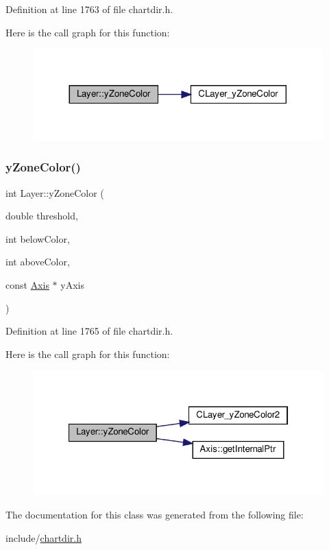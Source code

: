 Definition at line 1763 of file chartdir.\+h.

Here is the call graph for this function\+:
\nopagebreak
\begin{figure}[H]
\begin{center}
\leavevmode
\includegraphics[width=317pt]{class_layer_ae8ce1036fc1aa65453eaf08612e96e33_cgraph}
\end{center}
\end{figure}
\mbox{\label{class_layer_a3a39f0a1174c2ec7c37f477be5c69be8}} 
\subsubsection{\texorpdfstring{y\+Zone\+Color()}{yZoneColor()}\hspace{0.1cm}{\footnotesize\ttfamily [2/2]}}
{\footnotesize\ttfamily int Layer\+::y\+Zone\+Color (\begin{DoxyParamCaption}\item[{double}]{threshold,  }\item[{int}]{below\+Color,  }\item[{int}]{above\+Color,  }\item[{const \hyperlink{class_axis}{Axis} $\ast$}]{y\+Axis }\end{DoxyParamCaption})\hspace{0.3cm}{\ttfamily [inline]}}



Definition at line 1765 of file chartdir.\+h.

Here is the call graph for this function\+:
\nopagebreak
\begin{figure}[H]
\begin{center}
\leavevmode
\includegraphics[width=322pt]{class_layer_a3a39f0a1174c2ec7c37f477be5c69be8_cgraph}
\end{center}
\end{figure}


The documentation for this class was generated from the following file\+:\begin{DoxyCompactItemize}
\item 
include/\hyperlink{chartdir_8h}{chartdir.\+h}\end{DoxyCompactItemize}
